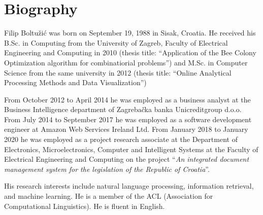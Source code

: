 \renewcommand{\leftmark}{Biography}
\chapter*{Biography}

Filip Boltužić was born on September 19, 1988 in Sisak, Croatia. 
He received his B.Sc. in Computing from the University of Zagreb, 
Faculty of Electrical Engineering and Computing in 2010 (thesis title:
``Application of the Bee Colony Optimization algorithm for combinatiorial problems'')
and M.Sc. in Computer Science from the same university in 2012 (thesis title:
``Online Analytical Processing Methods and Data Visualization'')

From October 2012 to April 2014 he was employed as a business analyst at the
Business Intelligence department of Zagrebačka banka Unicreditgroup d.o.o.
From July 2014 to September 2017 he was employed as a software development
engineer at Amazon Web Services Ireland Ltd. From January 2018 to January 2020
he was employed as a project research associate at the Department of
Electronics, Microelectronics, Computer and Intelligent Systems at the Faculty
of Electrical Engineering and Computing on the project ``\emph{An integrated
document management system for the legislation of the Republic of Croatia}''.

His research interests include natural language processing, information 
retrieval, and machine learning. He is a member of the ACL (Association for
Computational Linguistics). He is fluent in English.
